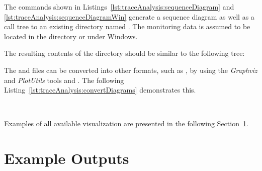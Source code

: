 The commands shown in Listings~\ref{lst:traceAnalysis:sequenceDiagram} and \ref{lst:traceAnalysis:sequenceDiagramWin} generate a sequence diagram as well as a call tree to an existing directory named . The monitoring data is assumed to be located in the directory  or  under Windows. %

\setBashListing



The resulting contents of the  directory should be similar to %
the following tree: 

\begin{figure}[H]
\begin{graybox}
\end{graybox}
\end{figure}

\noindent The  and  files can be converted into other formats, %
such as , by using the \textit{Graphviz} and \textit{PlotUtils} tools %
 and . %
The following Listing~\ref{lst:traceAnalysis:convertDiagrams} demonstrates this. %




% 


\

Examples of all available visualization are presented in the following %
Section~\ref{sec:traceAnalysisExamples}.

\pagebreak

\section{Example \KiekerTraceAnalysis{} Outputs}\label{sec:traceAnalysisExamples}

